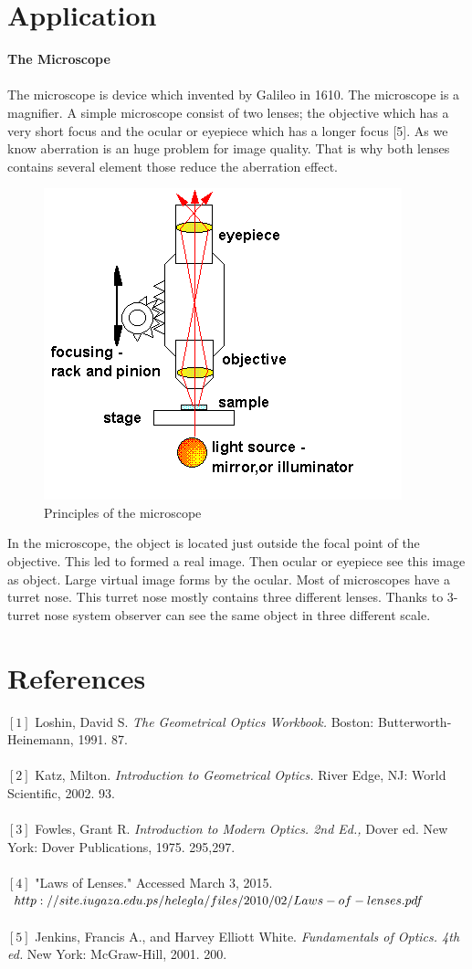 \documentclass[a4paper,12pt]{report}
\begin{document}
\chapter{Application}
\textbf{The Microscope}\\\\
The microscope is device which invented by Galileo in 1610. The microscope is a magnifier. A simple microscope consist of two lenses; the objective which has a very short focus and the ocular or eyepiece which has a longer focus [5]. As we know aberration is an huge problem for image quality. That is why both lenses contains several element those reduce the aberration effect.  
\begin{figure}[h]
\centering
\includegraphics[width=0.4\linewidth, height=0.2\textheight]{microscope}
\caption{Principles of the microscope}
\label{fig:microscope}
\end{figure}
In the microscope, the object is located just outside the focal point of the objective. This led to formed a real image. Then ocular or eyepiece see this image as object. Large virtual image forms by the ocular. Most of microscopes have a turret nose. This turret nose mostly contains three different lenses. Thanks to 3-turret nose system observer can see the same object in three different scale.











\chapter{References}
$[1]$ Loshin, David S. \textit{The Geometrical Optics Workbook.} Boston: Butterworth-Heinemann, 1991. 87.\\\\
$[2]$ Katz, Milton. \textit{Introduction to Geometrical Optics.} River Edge, NJ: World Scientific, 2002. 93.\\\\
$[3]$ Fowles, Grant R. \textit{Introduction to Modern Optics. 2nd Ed.,} Dover ed. New York: Dover Publications, 1975. 295,297.\\\\
$[4]$ "Laws of Lenses." Accessed March 3, 2015. $http://site.iugaza.edu.ps/hele\\gla/files/2010/02/Laws-of-lenses.pdf$\\\\
$[5]$ Jenkins, Francis A., and Harvey Elliott White. \textit{Fundamentals of Optics. 4th ed.} New York: McGraw-Hill, 2001. 200.
\end{document}
